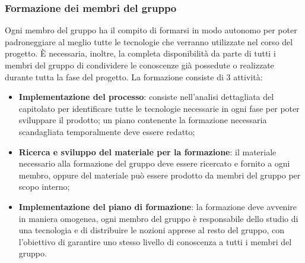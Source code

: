 \subsubsection{Formazione dei membri del gruppo}
 Ogni membro del gruppo ha il compito di formarsi in modo autonomo per poter padroneggiare al meglio tutte le tecnologie che verranno utilizzate nel corso del progetto.
È necessaria, inoltre, la completa disponibilità da parte di tutti i membri del gruppo di condividere le conoscenze già possedute o realizzate durante tutta la fase del progetto.
La formazione consiste di 3 attività:
\begin{itemize}
	\item \textbf{Implementazione del processo}: consiste nell'analisi dettagliata del capitolato per identificare tutte le tecnologie necessarie in ogni fase per poter sviluppare il prodotto; un piano contenente la formazione necessaria scandagliata temporalmente deve essere redatto;
	\item \textbf{Ricerca e sviluppo del materiale per la formazione}: il materiale necessario alla formazione del gruppo deve essere ricercato e fornito a ogni membro, oppure del materiale può essere prodotto da membri del gruppo per scopo interno;
	\item \textbf{Implementazione del piano di formazione}: la formazione deve avvenire in maniera omogenea, ogni membro del gruppo è responsabile dello studio di una tecnologia e di distribuire le nozioni apprese al resto del gruppo, con l'obiettivo di garantire uno stesso livello di conoscenza a tutti i membri del gruppo.
\end{itemize}
